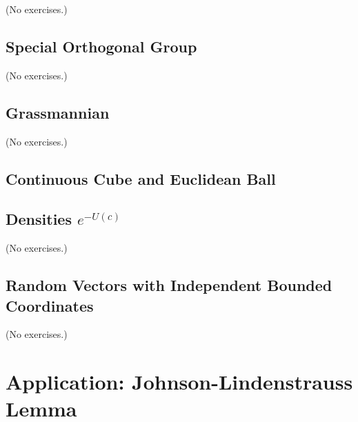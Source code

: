 \documentclass{report}
\theoremstyle{definition}
\newenvironment{exercise}[1]{
  \renewcommand\theexerciseimpl{#1}
  \exerciseimpl
}{\endexerciseimpl}
\begin{document}
(No exercises.)

\subsection{Special Orthogonal Group}

(No exercises.)

\subsection{Grassmannian}

(No exercises.)

\subsection{Continuous Cube and Euclidean Ball}

\begin{exercise}{5.2.11}
\end{exercise}

\begin{exercise}{5.2.12}
\end{exercise}

\begin{exercise}{5.2.13}
\end{exercise}

\begin{exercise}{5.2.14}
\end{exercise}

\subsection{Densities $e^{-U(c)}$}

(No exercises.)

\subsection{Random Vectors with Independent Bounded Coordinates}

(No exercises.)

\section{Application: Johnson-Lindenstrauss Lemma}

\begin{exercise}{5.3.3}
\end{exercise}

\begin{exercise}{5.3.4}
\end{exercise}
\end{document}
